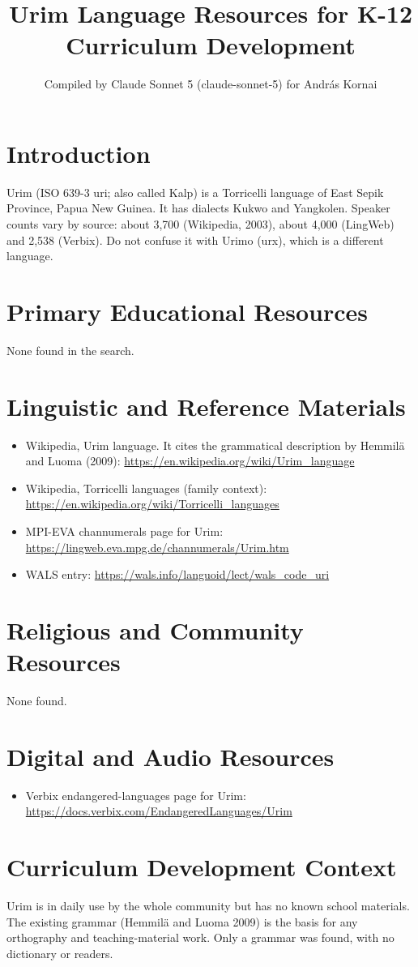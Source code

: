 \documentclass[12pt]{article}
\title{Urim Language Resources for K-12 Curriculum Development}
\author{Compiled by Claude Sonnet 5 (claude-sonnet-5) for Andr\'as Kornai}
\date{}
\begin{document}
\maketitle

\section{Introduction}
Urim (ISO 639-3 uri; also called Kalp) is a Torricelli language of East Sepik Province, Papua New Guinea. It has dialects Kukwo and Yangkolen. Speaker counts vary by source: about 3,700 (Wikipedia, 2003), about 4,000 (LingWeb) and 2,538 (Verbix). Do not confuse it with Urimo (urx), which is a different language.

\section{Primary Educational Resources}
None found in the search.

\section{Linguistic and Reference Materials}
\begin{itemize}
\item Wikipedia, Urim language. It cites the grammatical description by Hemmilä and Luoma (2009): \url{https://en.wikipedia.org/wiki/Urim_language}
\item Wikipedia, Torricelli languages (family context): \url{https://en.wikipedia.org/wiki/Torricelli_languages}
\item MPI-EVA channumerals page for Urim: \url{https://lingweb.eva.mpg.de/channumerals/Urim.htm}
\item WALS entry: \url{https://wals.info/languoid/lect/wals_code_uri}
\end{itemize}

\section{Religious and Community Resources}
None found.

\section{Digital and Audio Resources}
\begin{itemize}
\item Verbix endangered-languages page for Urim: \url{https://docs.verbix.com/EndangeredLanguages/Urim}
\end{itemize}

\section{Curriculum Development Context}
Urim is in daily use by the whole community but has no known school materials. The existing grammar (Hemmilä and Luoma 2009) is the basis for any orthography and teaching-material work. Only a grammar was found, with no dictionary or readers.
\end{document}
